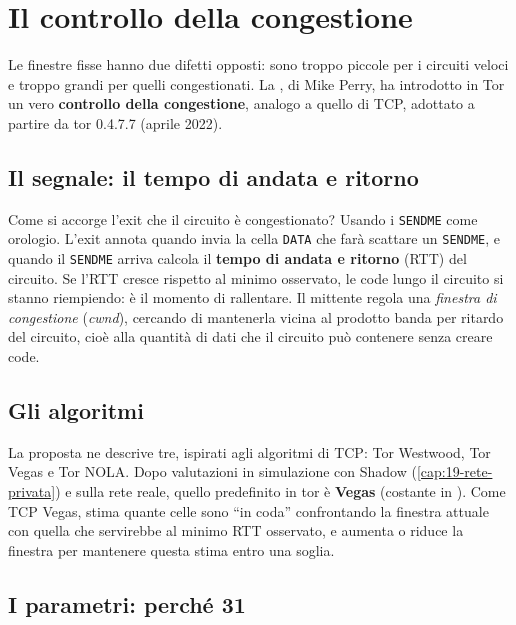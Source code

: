\section{Il controllo della congestione}\label{sec:cc}

Le finestre fisse hanno due difetti opposti: sono troppo piccole per i circuiti veloci e troppo grandi per quelli congestionati. La , di Mike Perry, ha introdotto in Tor un vero \textbf{controllo della congestione}, analogo a quello di TCP, adottato a partire da tor 0.4.7.7 (aprile 2022).

\subsection{Il segnale: il tempo di andata e ritorno}

Come si accorge l'exit che il circuito è congestionato? Usando i \texttt{SENDME} come orologio. L'exit annota quando invia la cella \texttt{DATA} che farà scattare un \texttt{SENDME}, e quando il \texttt{SENDME} arriva calcola il \textbf{tempo di andata e ritorno} (RTT) del circuito. Se l'RTT cresce rispetto al minimo osservato, le code lungo il circuito si stanno riempiendo: è il momento di rallentare. Il mittente regola una \emph{finestra di congestione} (\emph{cwnd}), cercando di mantenerla vicina al prodotto banda per ritardo del circuito, cioè alla quantità di dati che il circuito può contenere senza creare code.

\subsection{Gli algoritmi}

La proposta ne descrive tre, ispirati agli algoritmi di TCP: Tor Westwood, Tor Vegas e Tor NOLA. Dopo valutazioni in simulazione con Shadow (\cref{cap:19-rete-privata}) e sulla rete reale, quello predefinito in tor è \textbf{Vegas} (costante  in ). Come TCP Vegas, stima quante celle sono \enquote{in coda} confrontando la finestra attuale con quella che servirebbe al minimo RTT osservato, e aumenta o riduce la finestra per mantenere questa stima entro una soglia.

\subsection{I parametri: perché 31}

